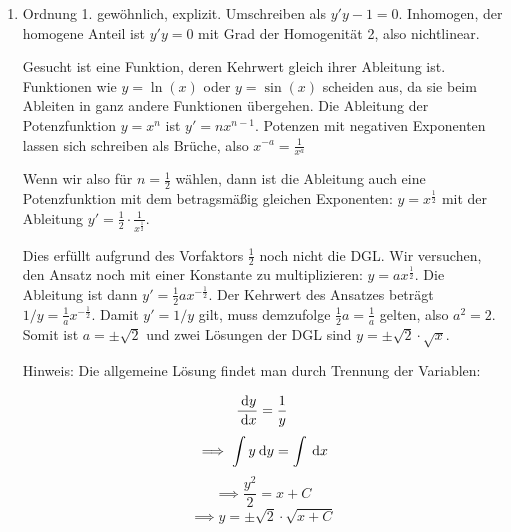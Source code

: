 \begin{enumerate}
\item Ordnung 1. gewöhnlich, explizit. Umschreiben als $y'y-1=0$. Inhomogen, der homogene Anteil ist $y'y=0$ mit Grad der Homogenität 2, also nichtlinear.

Gesucht ist eine Funktion, deren Kehrwert gleich ihrer Ableitung ist. Funktionen wie $y = \ln(x)$ oder $y = \sin(x)$ scheiden aus, da sie beim Ableiten in ganz andere Funktionen übergehen. Die Ableitung der Potenzfunktion $y=x^n$ ist $y' = n x^{n-1}$. Potenzen mit negativen Exponenten lassen sich schreiben als Brüche, also $x^{-a} = \frac{1}{x^a}$

Wenn wir also für $n=\frac{1}{2}$ wählen, dann ist die Ableitung auch eine Potenzfunktion mit dem betragsmäßig gleichen Exponenten: $y=x^{\frac{1}{2}}$ mit der Ableitung $y'=\frac{1}{2}\cdot\frac{1}{x^\frac{1}{2}}$.

Dies erfüllt aufgrund des Vorfaktors $\frac{1}{2}$ noch nicht die DGL. Wir versuchen, den Ansatz noch mit einer Konstante zu multiplizieren: $y=a x^{\frac{1}{2}}$. Die Ableitung ist dann $y'=\frac{1}{2}ax^{-\frac{1}{2}}$. Der Kehrwert des Ansatzes beträgt $1/y = \frac{1}{a} x^{-\frac{1}{2}}$. Damit $y' = 1/y$ gilt, muss demzufolge $\frac{1}{2}a = \frac{1}{a}$ gelten, also $a^2 = 2$. Somit ist $a=\pm \sqrt{2}$ und zwei Lösungen der DGL sind $y=\pm\sqrt{2}\cdot\sqrt{x}$.

Hinweis: Die allgemeine Lösung findet man durch Trennung der Variablen:

$$\frac{\:\mathrm{d}{y}}{\:\mathrm{d}{x}} = \frac{1}{y}$$
$$\implies \int y \:\mathrm{d}{y} = \int \:\mathrm{d}{x}$$
$$\implies \frac{y^2}{2} = x + C$$
$$\implies y = \pm\sqrt{2}\cdot\sqrt{x+C}$$
\end{enumerate}

